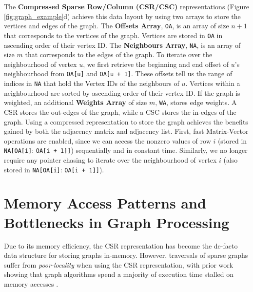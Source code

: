 The \textbf{Compressed Sparse Row/Column (\ac{CSR}/\ac{CSC})} representations (Figure \ref{fig:graph_example}d) achieve this data layout by using two arrays to store the vertices and edges of the graph. The \textbf{Offsets Array}, \texttt{OA}, is an array of size $n+1$ that corresponds to the vertices of the graph. Vertices are stored in \texttt{OA} in ascending order of their vertex ID. The \textbf{Neighbours Array}, \texttt{NA}, is an array of size $m$ that corresponds to the edges of the graph. To iterate over the neighbourhood of vertex $u$, we first retrieve the beginning and end offset of $u$'s neighbourhood from \texttt{OA[u]} and \texttt{OA[u + 1]}. These offsets tell us the range of indices in \texttt{NA} that hold the Vertex IDs of the neighbours of $u$. Vertices within a neighbourhood are sorted by ascending order of their vertex ID. If the graph is weighted, an additional \textbf{Weights Array} of size $m$, \texttt{WA}, stores edge weights. A \ac{CSR} stores the out-edges of the graph, while a \ac{CSC} stores the in-edges of the graph. Using a compressed representation to store the graph achieves the benefits gained by both the adjacency matrix and adjacency list.
First, fast Matrix-Vector operations are enabled, since we can access the nonzero values of row $i$ (stored in \texttt{NA[}\texttt{OA[i]}: \texttt{OA[i + 1]}\texttt{]}) sequentially and in constant time.
Similarly, we no longer require any pointer chasing to iterate over the neighbourhood of vertex $i$ (also stored in \texttt{NA[}\texttt{OA[i]}: \texttt{OA[i + 1]}\texttt{]}).

\section{Memory Access Patterns and Bottlenecks in Graph Processing}
Due to its memory efficiency, the \ac{CSR} representation has become the de-facto data structure for storing graphs in-memory. 
However, traversals of sparse graphs suffer from \textit{poor-locality} when using the \ac{CSR} representation,
with prior work showing that graph algorithms spend a majority of execution time stalled on memory accesses \cite{zhang2016optimizing}. 

